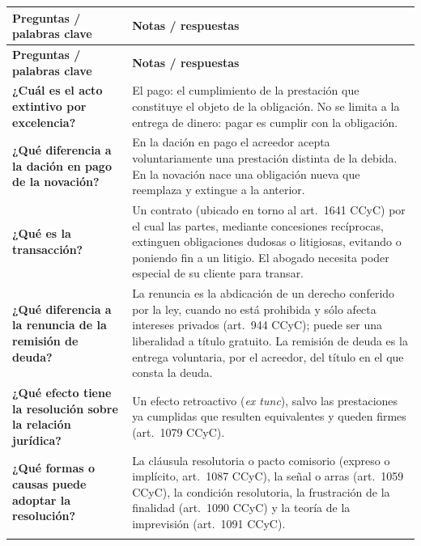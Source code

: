 \documentclass[12pt,oneside]{book}
\newlength{\cornellL}
\newlength{\cornellR}
\begin{document}
{\renewcommand{\arraystretch}{1.2}
\begin{longtable}{
    >{\raggedright\arraybackslash}p{\cornellL}
    >{\raggedright\arraybackslash}p{\cornellR}
}
\toprule
\textbf{Preguntas / palabras clave} &
\textbf{Notas / respuestas} \\
\midrule
\endfirsthead

\toprule
\textbf{Preguntas / palabras clave} &
\textbf{Notas / respuestas} \\
\midrule
\endhead

\textbf{¿Cuál es el acto extintivo por excelencia?} &
El pago: el cumplimiento de la prestación que constituye el objeto de la obligación. No se limita a la entrega de dinero: pagar es cumplir con la obligación. \\
\addlinespace

\textbf{¿Qué diferencia a la dación en pago de la novación?} &
En la dación en pago el acreedor acepta voluntariamente una prestación distinta de la debida. En la novación nace una obligación nueva que reemplaza y extingue a la anterior. \\
\addlinespace

\textbf{¿Qué es la transacción?} &
Un contrato (ubicado en torno al art.~1641 CCyC) por el cual las partes, mediante concesiones recíprocas, extinguen obligaciones dudosas o litigiosas, evitando o poniendo fin a un litigio. El abogado necesita poder especial de su cliente para transar. \\
\addlinespace

\textbf{¿Qué diferencia a la renuncia de la remisión de deuda?} &
La renuncia es la abdicación de un derecho conferido por la ley, cuando no está prohibida y sólo afecta intereses privados (art.~944 CCyC); puede ser una liberalidad a título gratuito. La remisión de deuda es la entrega voluntaria, por el acreedor, del título en el que consta la deuda. \\
\addlinespace

\textbf{¿Qué efecto tiene la resolución sobre la relación jurídica?} &
Un efecto retroactivo (\textit{ex tunc}), salvo las prestaciones ya cumplidas que resulten equivalentes y queden firmes (art.~1079 CCyC). \\
\addlinespace

\textbf{¿Qué formas o causas puede adoptar la resolución?} &
La cláusula resolutoria o pacto comisorio (expreso o implícito, art.~1087 CCyC), la señal o arras (art.~1059 CCyC), la condición resolutoria, la frustración de la finalidad (art.~1090 CCyC) y la teoría de la imprevisión (art.~1091 CCyC). \\
\addlinespace


\end{longtable}}
\end{document}
